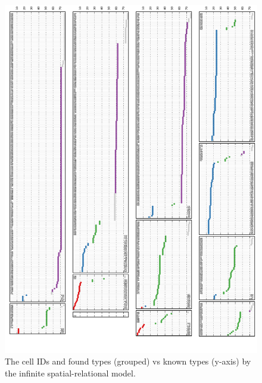 \documentclass{nature}
\begin{document}
\begin{figure}[h!]

  \centering 
    \centerline{\includegraphics[width=6.0in]{mouseretina/retina.1.2.ld.0.0.data-fixed_20_100-anneal_slow_400.truth_latent.pdf}}
  \caption{The cell IDs and found types (grouped) vs known types (y-axis) by the infinite spatial-relational model.}
\label{fig:supp:retinaldclusters}
\end{figure}
\end{document}

